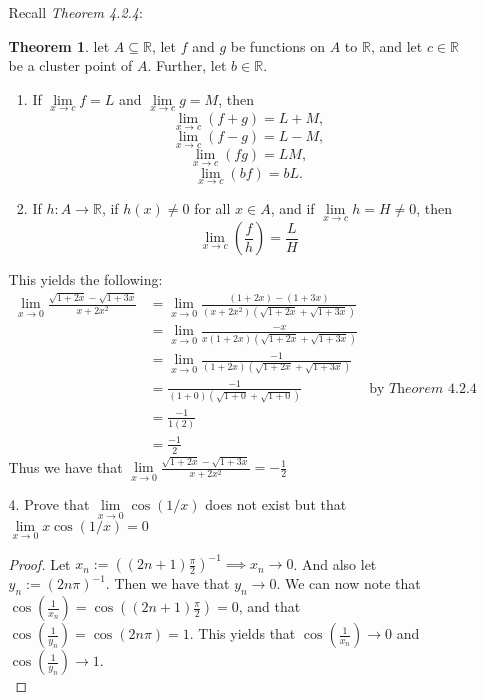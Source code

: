 \documentclass[12pt,letterpaper]{article}
\newcommand{\R}{\mathbb{R}}
\theoremstyle{case}
\theoremstyle{definition}
\newtheorem*{theorem*}{Theorem}
\begin{document}
\begin{enumerate}
\begin{enumerate}
			Recall \textit{Theorem 4.2.4}:
			\begin{theorem*}
				let $A \subseteq \R$, let $f$ and $g$ be functions on $A$ to $\R$, and let $c \in \R$ be a cluster point of $A$. Further, let $b \in \R$.
				\begin{enumerate}
					\item If $\lim\limits_{x\to c} f = L$ and $\lim\limits_{x\to c} g = M$, then
					\[\lim\limits_{x\to c} (f+g) = L+M,\]
					\[\lim\limits_{x\to c} (f-g)=L-M,\]
					\[\lim\limits_{x\to c} (fg) = LM,\]
					\[\lim\limits_{x\to c} (bf) = bL.\]
					
					\item If $h: A \rightarrow \R$, if $h(x) \neq 0$ for all $x \in A$, and if $\lim\limits_{x\to c} h = H \neq 0$, then
					\[\lim\limits_{x\to c} \left( \frac{f}{h} \right)= \frac{L}{H}\]
				\end{enumerate}
			\end{theorem*}
			This yields the following:
			\begin{align*}
				\lim\limits_{x \to 0} \frac{\sqrt{1+2x}-\sqrt{1+3x}}{x+2x^2} &= \lim\limits_{x \to 0} \frac{(1+2x)-(1+3x)}{(x+2x^2)(\sqrt{1+2x}+\sqrt{1+3x})} \\
				&= \lim\limits_{x \to 0} \frac{-x}{x(1+2x)(\sqrt{1+2x}+\sqrt{1+3x})} \\
				&= \lim\limits_{x \to 0} \frac{-1}{(1+2x)(\sqrt{1+2x}+\sqrt{1+3x})} \\
				&= \frac{-1}{(1+0)(\sqrt{1+0}+\sqrt{1+0})} &\text{by } \textit{Theorem 4.2.4} \\
				&= \frac{-1}{1(2)} \\
				&= \frac{-1}{2}
			\end{align*}
			Thus we have that $\lim\limits_{x \to 0} \frac{\sqrt{1+2x}-\sqrt{1+3x}}{x+2x^2}=-\frac{1}{2}$
			
			\item[4.] Prove that $\lim\limits_{x \to 0} \cos (1/x)$ does not exist but that $\lim\limits_{x \to 0} x \cos (1/x)=0$\\
			
			\begin{proof}
				Let $x_n:=\left((2n+1)\frac{\pi}{2}\right)^{-1} \implies x_n \to 0$. And also let $y_n:=(2n\pi)^{-1}$. Then we have that $y_n \to 0$. We can now note that $\cos \left(\frac{1}{x_n}\right)=\cos \left((2n+1)\frac{\pi}{2}\right)=0$, and that $\cos \left(\frac{1}{y_n}\right) = \cos (2n\pi) = 1$. This yields that $\cos \left(\frac{1}{x_n}\right) \to 0$ and $\cos \left(\frac{1}{y_n}\right) \to 1$.\\
				

\end{proof}
\end{enumerate}
\end{enumerate}
\end{document}
